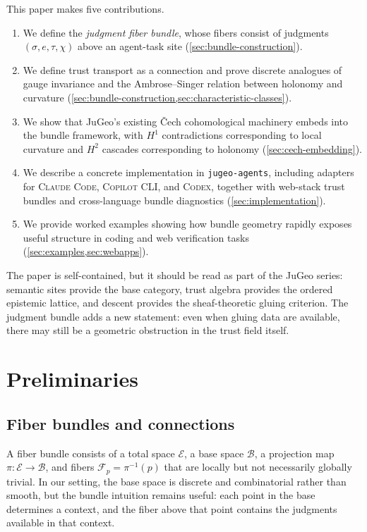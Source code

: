 \documentclass[11pt]{article}
\newcommand{\Bundle}{\mathcal{E}}
\newcommand{\Base}{\mathcal{B}}
\newcommand{\Fiber}{\mathcal{F}}
\newcommand{\Claim}{\sigma}
\newcommand{\Evidence}{e}
\newcommand{\Channel}{\chi}
\newcommand{\TrustVar}{\tau}
\newcommand{\JuGeoAgents}{\texttt{jugeo-agents}}
\newcommand{\ClaudeCode}{\textsc{Claude Code}}
\newcommand{\CopilotCLI}{\textsc{Copilot CLI}}
\newcommand{\CodexCLI}{\textsc{Codex}}
\begin{document}
This paper makes five contributions.
\begin{enumerate}
  \item We define the \emph{judgment fiber bundle}, whose fibers consist of
    judgments $(\Claim, \Evidence, \TrustVar, \Channel)$ above an agent-task site
    (\cref{sec:bundle-construction}).
  \item We define trust transport as a connection and prove discrete analogues
    of gauge invariance and the Ambrose--Singer relation between holonomy and
    curvature (\cref{sec:bundle-construction,sec:characteristic-classes}).
  \item We show that JuGeo's existing \v{C}ech cohomological machinery embeds
    into the bundle framework, with $H^1$ contradictions corresponding to local
    curvature and $H^2$ cascades corresponding to holonomy
    (\cref{sec:cech-embedding}).
  \item We describe a concrete implementation in \JuGeoAgents{}, including
    adapters for \ClaudeCode{}, \CopilotCLI{}, and \CodexCLI{}, together with
    web-stack trust bundles and cross-language bundle diagnostics
    (\cref{sec:implementation}).
  \item We provide worked examples showing how bundle geometry rapidly exposes
    useful structure in coding and web verification tasks
    (\cref{sec:examples,sec:webapps}).
\end{enumerate}

The paper is self-contained, but it should be read as part of the JuGeo series:
semantic sites provide the base category, trust algebra provides the ordered
epistemic lattice, and descent provides the sheaf-theoretic gluing criterion.
The judgment bundle adds a new statement: even when gluing data are available,
there may still be a geometric obstruction in the trust field itself.

\section{Preliminaries}\label{sec:preliminaries}

\subsection{Fiber bundles and connections}

A fiber bundle consists of a total space $\Bundle$, a base space $\Base$, a
projection map $\pi : \Bundle \to \Base$, and fibers $\Fiber_p = \pi^{-1}(p)$
that are locally but not necessarily globally trivial.  In our setting, the
base space is discrete and combinatorial rather than smooth, but the bundle
intuition remains useful: each point in the base determines a context, and the
fiber above that point contains the judgments available in that context.
\end{document}
